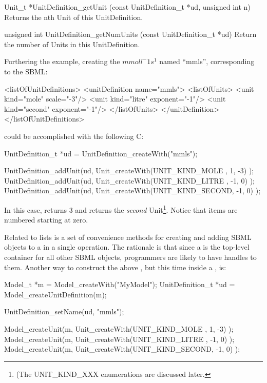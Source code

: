 \documentclass{cekmanual}
\begin{document}
\begin{methoddef}{Unit\_t *UnitDefinition\_getUnit (const UnitDefinition\_t
*ud, unsigned int n)}
Returns the nth Unit of this UnitDefinition.
\end{methoddef}

\begin{methoddef}{unsigned int UnitDefinition\_getNumUnits (const
UnitDefinition\_t *ud)}
  Return the number of Units in this UnitDefinition.
\end{methoddef}


Furthering the example, creating the  $mmol l^-1
s^1$ named ``mmls'', corresponding to the SBML:

\begin{example}
<listOfUnitDefinitions>
  <unitDefinition name="mmls">
    <listOfUnits>
      <unit kind="mole"   scale="-3"/>
      <unit kind="litre"  exponent="-1"/>
      <unit kind="second" exponent="-1"/>
    </listOfUnits>
  </unitDefinition>
</listOfUnitDefinitions>
\end{example}


could be accomplished with the following C:

\begin{example}[c]
UnitDefinition_t *ud = UnitDefinition_createWith("mmls");

UnitDefinition_addUnit(ud, Unit_createWith(UNIT_KIND_MOLE  ,  1, -3) );
UnitDefinition_addUnit(ud, Unit_createWith(UNIT_KIND_LITRE , -1,  0) );
UnitDefinition_addUnit(ud, Unit_createWith(UNIT_KIND_SECOND, -1,  0) );
\end{example}


In this case, 
returns 3 and 
returns the \emph{second} Unit\footnote{(The UNIT\_KIND\_XXX
enumerations are discussed later.}.  Notice that items are numbered
starting at zero.

Related to lists is a set of convenience methods for creating and
adding SBML objects to a  in a single operation.  The
rationale is that since a  is the top-level container for
all other SBML objects, programmers are likely to have handles to
them.  Another way to construct the above , but
this time inside a , is:


\begin{example}[c]
Model_t            *m  = Model_createWith("MyModel");
UnitDefinition_t   *ud = Model_createUnitDefinition(m);

UnitDefinition_setName(ud, "mmls");

Model_createUnit(m, Unit_createWith(UNIT_KIND_MOLE  ,  1, -3) );
Model_createUnit(m, Unit_createWith(UNIT_KIND_LITRE , -1,  0) );
Model_createUnit(m, Unit_createWith(UNIT_KIND_SECOND, -1,  0) );
\end{example}
\end{document}
